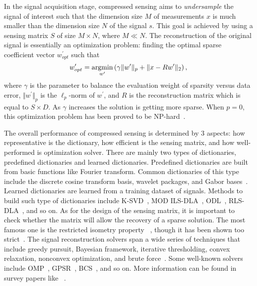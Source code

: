 In the signal acquisition stage, compressed sensing aims to \textit{undersample} the signal of interest such that the dimension size $M$ of measurements $x$ is much smaller than the dimension size $N$ of the signal $s$. This goal is achieved by using a sensing matrix $S$ of size $M \times N$, where $M \ll N$.
%
The reconstruction of the original signal is essentially an optimization problem: 
finding the optimal sparse coefficient vector
$w^\prime_{opt}$ such that 
\begin{equation}\label{eq:reconstruction}
w^\prime_{opt}
=
\operatorname*{argmin}_{w^\prime}
\left( 
\gamma
\Vert w^\prime \Vert_p
+
\Vert x - R w^\prime \Vert_2
\right) 
,
\end{equation}
where $\gamma$ is the parameter to balance the evaluation weight of sparsity versus data error, $\Vert w^\prime \Vert_p$ is the $\ell_p$-norm of $w^\prime$, and $R$ is the reconstruction matrix which is equal to $S \times D$. As $\gamma$ increases the solution is getting more sparse. When $p=0$, this optimization problem has been proved to be NP-hard~\cite{natarajan1995sparse}. 







The overall performance of compressed sensing is determined by 3 aspects: how representative is the dictionary, how efficient is the sensing matrix, and how well-performed is optimization solver.
%
There are mainly two types of dictionaries, predefined dictionaries and learned dictionaries. Predefined dictionaries are built from basic functions like Fourier transform. Common dictionaries of this type include the discrete cosine transform basis, wavelet packages, and Gabor bases~\cite{skretting2017sparse}. Learned dictionaries are learned from a training dataset of signals. Methods to build such type of dictionaries include K-SVD~\cite{aharon2006k}, MOD ILS-DLA~\cite{engan2007family}, ODL~\cite{mairal2009online}, RLS-DLA~\cite{skretting2010recursive}, and so on.
%
As for the design of the sensing matrix, it is important to check whether the matrix will allow the recovery of a sparse solution. The most famous one is the restricted isometry property ~\cite{candes2008restricted}, though it has been shown too strict~\cite{donoho2009observed}.
%
The signal reconstruction solvers span a wide series of techniques that include 
greedy pursuit, Bayesian framework, iterative thresholding, convex relaxation, nonconvex optimization, and brute force~\cite{tropp2010computational}. Some well-known solvers include
OMP~\cite{tropp2007signal}, GPSR~\cite{figueiredo2007gradient}, BCS~\cite{ji2008bayesian}, and so on. 
%
More information can be found in survey papers like ~\cite{zhang2015survey,skretting2017sparse,rani2018systematic}.




